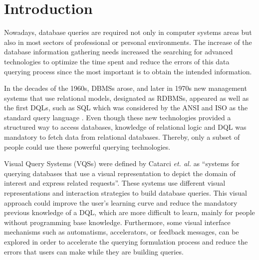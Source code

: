 \newcommand{\novathesis}{\emph{novathesis}}
\newcommand{\novathesisclass}{\texttt{novathesis.cls}}


\chapter{Introduction}
\label{cha:introduction}
Nowadays, database queries are required not only in computer systems areas but also in most sectors of professional or personal environments. The increase of the database information gathering needs increased the searching for advanced technologies to optimize the time spent and reduce the errors of this data querying process since the most important is to obtain the intended information.

In the decades of the 1960s, \glspl{DBMS} arose, and later in 1970s new management systems that use relational models, designated as \glspl{RDBMS}, appeared as well as the first \glspl{DQL}, such as \gls{SQL} \cite{sequel_aStructuredEnglishQueryLanguage} which was considered by the \gls{ANSI} and \gls{ISO} as the standard query language \cite{databaseManagementSystems}. Even though these new technologies provided a structured way to access databases, knowledge of relational logic and \gls{DQL} was mandatory to fetch data from relational databases. Thereby, only a subset of people could use these powerful querying technologies.

Visual Query Systems (VQSs) were defined by Catarci \textit{et. al.} \cite{visualQuerySystemsForDatabases_aSurvey} as “systems for querying databases that use a visual representation to depict the domain of interest and express related requests”. These systems use different visual representations and interaction strategies to build database queries. This visual approach could improve the user's learning curve and reduce the mandatory previous knowledge of a \gls{DQL}, which are more difficult to learn, mainly for people without programming base knowledge. Furthermore, some visual interface mechanisms such as automatisms, accelerators, or feedback messages, can be explored in order to accelerate the querying formulation process and reduce the errors that users can make while they are building queries.

